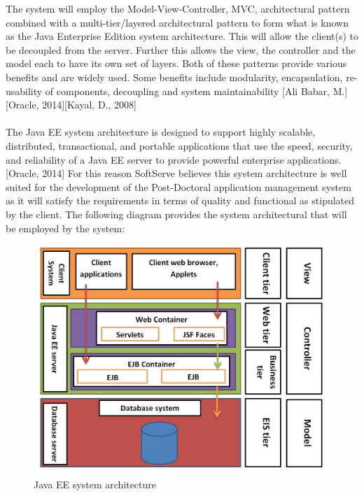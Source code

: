 \documentclass[12pt]{article}
\begin{document}

The system will employ the Model-View-Controller, MVC, architectural pattern combined with a multi-tier/layered architectural pattern to form what is known as the Java Enterprise Edition system architecture. This will allow the client(s) to be decoupled from the server. Further this allows the view, the controller and the model each to have its own set of layers. Both of these patterns provide various benefits and are widely used. Some benefits include modularity, encapsulation, re-usability of components, decoupling and system maintainability [Ali Babar, M.] [Oracle, 2014][Kayal, D., 2008]\\
\\
The Java EE system architecture is designed to support highly scalable, distributed, transactional, and portable applications that use the speed, security, and reliability of a Java EE server to provide powerful enterprise applications. [Oracle, 2014] For this reason SoftServe believes this system architecture is well suited for the development of the Post-Doctoral application management system as it will satisfy the requirements in terms of quality and functional as stipulated by the client. The following diagram provides the system architectural that will be employed by the system:\\

\begin{figure}[H]
\centering
\includegraphics[scale=0.8]{../Images_Docs/Diagrams/Architecture/Java EE system architecture.jpg}
\caption{Java EE system architecture}
\end{figure}
\end{document}
